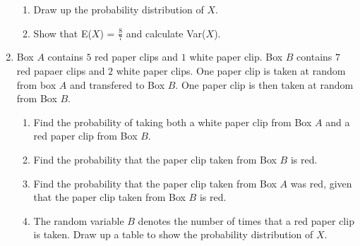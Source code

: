 \begin{enumerate}
   \begin{enumerate}
   	\item Draw up the probability distribution of $X$.
   	\item Show that E($X$) = $\frac{8}{7}$ and calculate Var($X$).
   \end{enumerate}

\item Box $A$ contains $5$ red paper clips and $1$ white paper clip. Box $B$ contains $7$ red papaer clips and $2$ white paper clips. One paper clip is taken at random from box $A$ and transfered to Box $B$. One paper clip is then taken at random from Box $B$.

\begin{enumerate}
	\item Find the probability of taking both a white paper clip from Box $A$ and a red paper clip from Box $B$.
	\item Find the probability that the paper clip taken from Box $B$ is red.
	\item Find the probability that the paper clip taken from Box $A$ was red, given that the paper clip taken from Box $B$ is red.
	\item The random variable $B$ denotes the number of times that a red paper clip is taken. Draw up  a table to show the probability  distribution of $X$.
\end{enumerate} 


	
\end{enumerate}



\newpage

\mis    %



